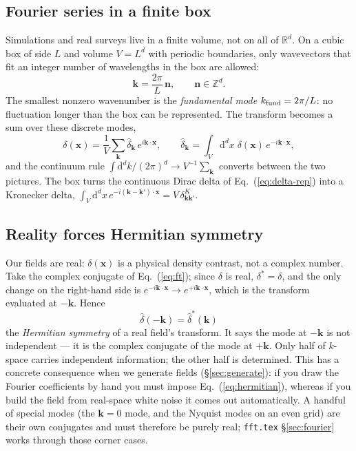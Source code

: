\documentclass[12pt]{article}
\newcommand{\bk}{\mathbf{k}}
\newcommand{\bx}{\mathbf{x}}
\newcommand{\bn}{\mathbf{n}}
\newcommand{\code}[1]{\texttt{#1}}
\begin{document}
\subsection{Fourier series in a finite box}
\label{sec:fseries}

Simulations and real surveys live in a finite volume, not on all of
$\mathbb R^d$.  On a cubic box of side $L$ and volume $V = L^d$ with
periodic boundaries, only wavevectors that fit an integer number of
wavelengths in the box are allowed:
\begin{equation}
  \bk = \frac{2\pi}{L}\,\bn, \qquad \bn \in \mathbb Z^d .
\end{equation}
The smallest nonzero wavenumber is the \emph{fundamental mode}
$k_{\rm fund} = 2\pi/L$: no fluctuation longer than the box can be
represented.  The transform becomes a sum over these discrete modes,
\begin{equation}
  \delta(\bx) = \frac{1}{V}\sum_{\bk} \hat\delta_{\bk}\,e^{i\bk\cdot\bx},
  \qquad
  \hat\delta_{\bk} = \int_V \mathrm d^d x\; \delta(\bx)\,e^{-i\bk\cdot\bx},
  \label{eq:fseries}
\end{equation}
and the continuum rule $\int \mathrm d^d k/(2\pi)^d \to V^{-1}\sum_\bk$
converts between the two pictures.  The box turns the continuous Dirac
delta of Eq.~(\ref{eq:delta-rep}) into a Kronecker delta,
$\int_V \mathrm d^d x\, e^{-i(\bk-\bk')\cdot\bx} = V\,\delta^K_{\bk\bk'}$.

\subsection{Reality forces Hermitian symmetry}
\label{sec:hermitian}

Our fields are real: $\delta(\bx)$ is a physical density contrast, not a
complex number.  Take the complex conjugate of Eq.~(\ref{eq:ft}); since
$\delta$ is real, $\delta^* = \delta$, and the only change on the
right-hand side is $e^{-i\bk\cdot\bx} \to e^{+i\bk\cdot\bx}$, which is
the transform evaluated at $-\bk$.  Hence
\begin{equation}
  \boxed{\;\hat\delta(-\bk) = \hat\delta^*(\bk)\;}
  \label{eq:hermitian}
\end{equation}
the \emph{Hermitian symmetry} of a real field's transform.  It says the
mode at $-\bk$ is not independent --- it is the complex conjugate of the
mode at $+\bk$.  Only half of $k$-space carries independent information;
the other half is determined.  This has a concrete consequence when we
generate fields (\S\ref{sec:generate}): if you draw the Fourier
coefficients by hand you must impose Eq.~(\ref{eq:hermitian}), whereas if
you build the field from real-space white noise it comes out
automatically.  A handful of special modes (the $\bk = 0$ mode, and the
Nyquist modes on an even grid) are their own conjugates and must
therefore be purely real; \code{fft.tex} \S\ref{sec:fourier} works
through those corner cases.
\end{document}
